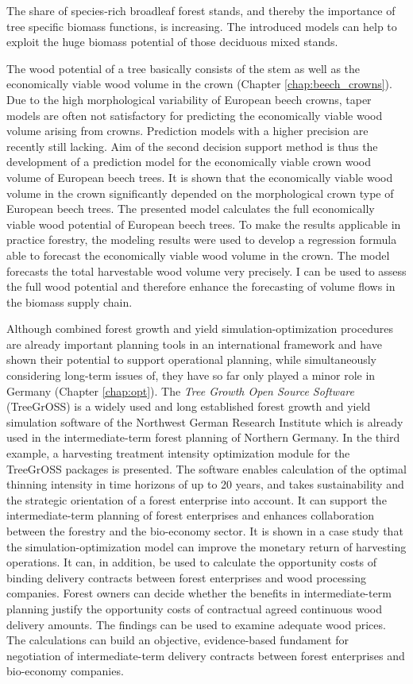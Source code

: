  The share of species-rich broadleaf forest stands, and thereby the importance of tree specific biomass functions, is increasing. The introduced models can help to exploit the huge biomass potential of those deciduous mixed stands.

The wood potential of a tree basically consists of the stem as well as the economically viable wood volume in the crown (Chapter \ref{chap:beech_crowns}). Due to the high morphological variability of European beech crowns, taper models are often not satisfactory for predicting the economically viable wood volume arising from crowns. Prediction models with a higher precision are recently still lacking. Aim of the second decision support method is thus the development of a prediction model for the economically viable crown wood volume of European beech trees. It is shown that the economically viable wood volume in the crown significantly depended on the morphological crown type of European beech trees. The presented model calculates the full economically viable wood potential of European beech trees. To make the results applicable in practice forestry, the modeling results were used to develop a regression formula able to forecast the economically viable wood volume in the crown. The model forecasts the total harvestable wood volume very precisely. I can be used to assess the full wood potential and therefore enhance the forecasting of volume flows in the biomass supply chain.

Although combined forest growth and yield si\-mu\-la\-tion-op\-ti\-mi\-za\-tion procedures are already important planning tools in an international framework and have shown their potential to support operational planning, while simultaneously considering long-term issues of, they have so far only played a minor role in Germany (Chapter \ref{chap:opt}). The \textit{Tree Growth Open Source Software} (TreeGrOSS) is a widely used and long established forest growth and yield simulation software of the Northwest German Research Institute which is already used in the intermediate-term forest planning of Northern Germany. In the third example, a harvesting treatment intensity optimization module for the TreeGrOSS packages is presented. The software enables calculation of the optimal thinning intensity in time horizons of up to 20 years, and takes sustainability and the strategic orientation of a forest enterprise into account. It can support the intermediate-term planning of forest enterprises and enhances collaboration between the forestry and the bio-economy sector. It is shown in a case study that the si\-mu\-la\-tion-op\-ti\-mi\-za\-tion model can improve the monetary return of harvesting operations. It can, in addition, be used to calculate the opportunity costs of binding delivery contracts between forest enterprises and wood processing companies. Forest owners can decide whether the benefits in intermediate-term planning justify the opportunity costs of contractual agreed continuous wood delivery amounts. The findings can be used to examine adequate wood prices. The calculations can build an objective, evidence-based fundament for negotiation of intermediate-term delivery contracts between forest enterprises and bio-economy companies.